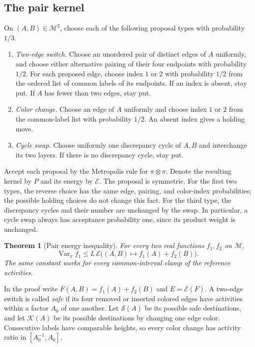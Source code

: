 \documentclass[11pt]{article}
\newtheorem{theorem}{Theorem}[section]
\theoremstyle{definition}
\theoremstyle{remark}
\DeclareMathOperator{\Var}{Var}
\newcommand{\calM}{\mathcal M}
\newcommand{\calE}{\mathcal E}
\numberwithin{equation}{section}
\begin{document}
\subsection{The pair kernel}

On $(A,B)\in\calM^2$, choose each of the following proposal types with
probability $1/3$.
\begin{enumerate}[label=\textup{(\arabic*)}]
 \item \emph{Two-edge switch.}  Choose an unordered pair of distinct
 edges of $A$ uniformly, and choose either alternative pairing of
 their four endpoints with probability $1/2$.  For each proposed
 edge, choose index $1$ or $2$ with probability $1/2$ from the ordered
 list of common labels of its endpoints.  If an index is absent,
 stay put.  If $A$ has fewer than two edges, stay put.

 \item \emph{Color change.}  Choose an edge of $A$ uniformly and
 choose index $1$ or $2$ from the common-label list with probability
 $1/2$.  An absent index gives a holding move.

 \item \emph{Cycle swap.}  Choose uniformly one discrepancy cycle of
 $A,B$ and interchange its two layers.  If there is no discrepancy
 cycle, stay put.
\end{enumerate}
Accept each proposal by the Metropolis rule for $\pi\otimes\pi$.
Denote the resulting kernel by $P$ and its energy by $\calE$.
The proposal is symmetric.  For the first two types, the reverse
choice has the same edge, pairing, and color-index probabilities;
the possible holding choices do not change this fact.  For the third
type, the discrepancy cycles and their number are unchanged by the
swap.  In particular, a cycle swap always has acceptance probability
one, since its product weight is unchanged.

\begin{theorem}[Pair energy inequality]
\label{thm:pair-energy}
For every two real functions $f_1,f_2$ on $\calM$,
\begin{equation}
\label{eq:pair-energy}
 \Var_\pi f_1\le L\,
 \calE\bigl((A,B)\mapsto f_1(A)+f_2(B)\bigr).
\end{equation}
The same constant works for every common-interval clamp of the
reference activities.
\end{theorem}

In the proof write $F(A,B)=f_1(A)+f_2(B)$ and $E=\calE(F)$.
A two-edge switch is called \emph{safe} if its four removed or
inserted colored edges have activities within a factor $A_0$ of one
another.  Let $\mathcal S(A)$ be its possible safe destinations, and
let $\mathcal K(A)$ be its possible destinations by changing one
edge color.  Consecutive labels have comparable heights, so every
color change has activity ratio in $[A_0^{-1},A_0]$.
\end{document}
